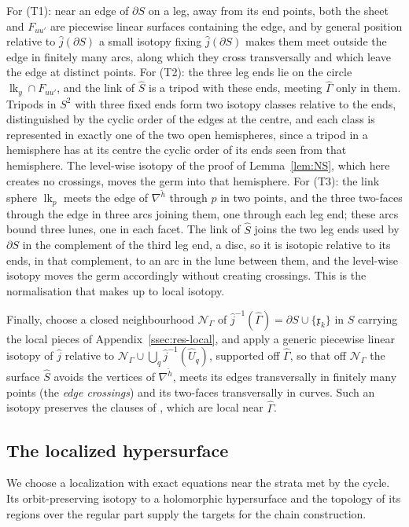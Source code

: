 For (T1): near an edge of $\partial S$ on a leg, away from its end points, both the sheet and $F_{uu'}$ are piecewise linear
surfaces containing the edge, and by general position relative to $\hat j(\partial S)$ \cite[Ch.~5]{RS} a small isotopy fixing
$\hat j(\partial S)$ makes them meet outside the edge in finitely many arcs, along which they cross transversally and which
leave the edge at distinct points. For (T2): the three leg ends lie on the circle $\operatorname{lk}_y\cap F_{uu'}$, and the
link of $\hat S$ is a tripod with these ends, meeting $\widehat\Gamma$ only in them. Tripods in $S^2$ with three fixed ends
form two isotopy classes relative to the ends, distinguished by the cyclic order of the edges at the centre, and each class is
represented in exactly one of the two open hemispheres, since a tripod in a hemisphere has at its centre the cyclic order of
its ends seen from that hemisphere. The level-wise isotopy of the proof of Lemma~\ref{lem:NS}, which here creates no crossings,
moves the germ into that hemisphere. For (T3): the link sphere $\operatorname{lk}_p$ meets the edge of $\nabla^{\check h}$
through $p$ in two points, and the three two-faces through the edge in three arcs joining them, one through each leg end;
these arcs bound three lunes, one in each facet. The link of $\hat S$ joins the two leg ends used by $\partial S$ in the
complement of the third leg end, a disc, so it is isotopic relative to its ends, in that complement, to an arc in the lune
between them, and the level-wise isotopy moves the germ accordingly without creating crossings. This is the normalisation
that \cite[\S7.4]{CBM} makes up to local isotopy.

Finally, choose a closed neighbourhood $\mathcal N_\Gamma$ of $\hat j^{-1}(\widehat\Gamma)=\partial S\cup\{\mathfrak x_k\}$ in
$S$ carrying the local pieces of Appendix~\ref{ssec:res-local}, and apply a generic piecewise linear isotopy of $\hat j$
relative to $\mathcal N_\Gamma\cup\bigcup_q\hat j^{-1}(\widehat U_q)$, supported off $\widehat\Gamma$, so that off
$\mathcal N_\Gamma$ the surface $\hat S$ avoids the vertices of $\nabla^{\check h}$, meets its edges transversally in finitely
many points (the \emph{edge crossings}) and its two-faces transversally in curves. Such an isotopy preserves the clauses of
\cite[Def.~7.2]{CBM}, which are local near $\widehat\Gamma$.

\subsection{The localized hypersurface}\label{ssec:res-W}
We choose a localization with exact equations near the strata met by the cycle.
Its orbit-preserving isotopy to a holomorphic hypersurface and the topology of its regions over the regular part supply the targets for the chain construction.

